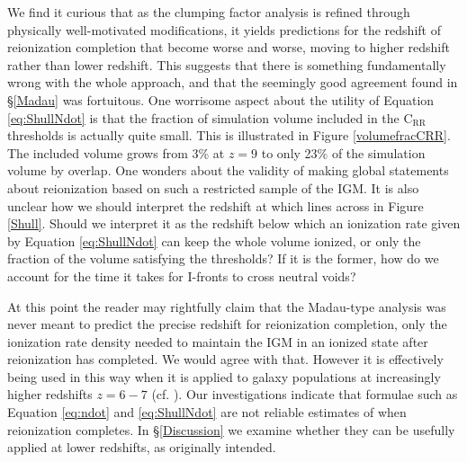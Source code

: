 We find it curious that as the clumping factor analysis is refined through physically well-motivated modifications, it yields predictions for the redshift of reionization completion that become worse and worse, moving to higher redshift rather than lower redshift. This suggests that there is something fundamentally wrong with the whole approach, and that the seemingly good agreement found in \S\ref{Madau} was fortuitous. One worrisome aspect about the utility of Equation \eqref{eq:ShullNdot} is that the fraction of simulation volume included in the C$_\mathrm{RR}$ thresholds is actually quite small. This is illustrated in Figure \ref{volumefracCRR}. The included volume grows from 3\% at $z=9$ to only 23\% of the simulation volume by overlap. One wonders about the validity of making global statements about reionization based on such a restricted sample of the IGM. It is also unclear how we should interpret the redshift at which lines across in Figure \ref{Shull}. Should we interpret it as the redshift below which an ionization rate given by Equation \eqref{eq:ShullNdot} can keep the whole volume ionized, or only the fraction of the volume satisfying the thresholds? If it is the former, how do we account for the time it takes for I-fronts to cross neutral voids?

At this point the reader may rightfully claim that the Madau-type analysis was never meant to predict the precise redshift for reionization completion, only the ionization rate density needed to maintain the IGM in an ionized state after reionization has completed. We would agree with that. However it is effectively being used in this way when it is applied to galaxy populations at increasingly higher redshifts $z=6-7$  (cf. \cite{FanEtAl2006, RobertsonEtAl2013}). Our investigations indicate that formulae such as Equation \eqref{eq:ndot} and \eqref{eq:ShullNdot} are not reliable estimates of when reionization completes. In \S\ref{Discussion} we examine whether they can be usefully applied at lower redshifts, as originally intended. 



 

